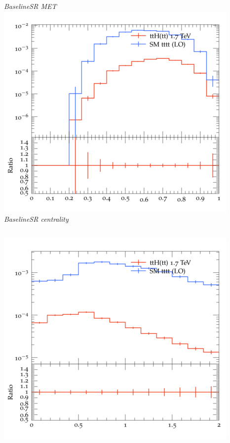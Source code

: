 \documentclass{beamer}
\begin{document}
\begin{frame}
\begin{columns}
\textit{\small BaselineSR MET}
\includegraphics[width=\textwidth]{../plots/ttH_1700/tttt_ttH_1LOS/BaselineSR_centrality.png}\\
\textit{\small BaselineSR centrality}
\end{columns}
\begin{columns}
\includegraphics[width=\textwidth]{../plots/ttH_1700/tttt_ttH_1LOS/BaselineSR_deltaR_bl_min.png}\\

\end{columns}
\end{frame}
\end{document}

